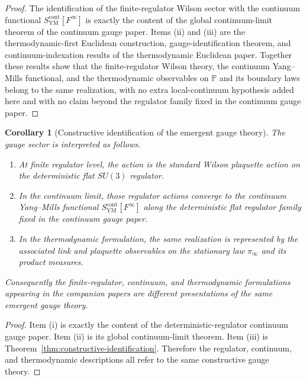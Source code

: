 \documentclass[11pt]{article}
\newtheorem{corollary}[theorem]{Corollary}
\theoremstyle{definition}
\theoremstyle{remark}
\begin{document}
\begin{proof}
The identification of the finite-regulator Wilson sector with the continuum
functional $S_{\mathrm{YM}}^{\mathrm{cont}}[F^\infty]$ is exactly the content
of the global continuum-limit theorem of the continuum gauge paper.
Items \textnormal{(ii)} and \textnormal{(iii)} are the thermodynamic-first
Euclidean construction, gauge-identification theorem, and continuum-indexation
results of the thermodynamic Euclidean paper.  Together these results show that
the finite-regulator Wilson theory, the continuum Yang--Mills functional, and
the thermodynamic observables on $\mathbb P$ and its boundary laws belong to
the same realization, with no extra local-continuum hypothesis added here and
with no claim beyond the regulator family fixed in the continuum gauge paper.
\end{proof}

\begin{corollary}[Constructive identification of the emergent gauge theory]
\label{cor:identification}
The gauge sector is interpreted as follows.
\begin{enumerate}[label=\textnormal{(\roman*)},leftmargin=1.5em]
\item At finite regulator level, the action is the standard Wilson plaquette
action on the deterministic flat $SU(3)$ regulator.
\item In the continuum limit, those regulator actions converge to the
continuum Yang--Mills functional $S_{\mathrm{YM}}^{\mathrm{cont}}[F^\infty]$
along the deterministic flat regulator family fixed in the continuum gauge
paper.
\item In the thermodynamic formulation, the same realization is represented by
the associated link and plaquette observables on the stationary law
$\pi_\infty$ and its product measures.
\end{enumerate}
Consequently the finite-regulator, continuum, and thermodynamic formulations
appearing in the companion papers are different presentations of the same
emergent gauge theory.
\end{corollary}

\begin{proof}
Item \textnormal{(i)} is exactly the content of the deterministic-regulator
continuum gauge paper.
Item \textnormal{(ii)} is its global continuum-limit theorem.
Item \textnormal{(iii)} is Theorem~\ref{thm:constructive-identification}.
Therefore the regulator, continuum, and thermodynamic descriptions all refer to
the same constructive gauge theory.
\end{proof}
\end{document}
